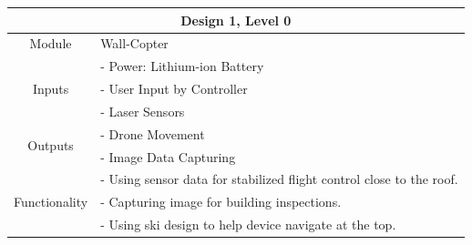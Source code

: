 \documentclass[12pt]{article}
\begin{document}
            \vspace{0.5in}
            \begin{tabular}{|c|l|}
                \hline
                \multicolumn{2}{|c|}{\textbf{Design 1, Level 0}} \\\hline
                Module & Wall-Copter \\\hline
                \multirow{3}{3cm}{Inputs}
                    & - Power: Lithium-ion Battery\\
                    & - User Input by Controller \\
                    & - Laser Sensors \\
                    \hline
                \multirow{2}{3cm}{Outputs}
                    & - Drone Movement \\
                    & - Image Data Capturing \\
                    \hline
                \multirow{3}{3cm}{Functionality}
                    & - Using sensor data for stabilized flight control close to the roof. \\
                    & - Capturing image for building inspections. \\
                    & - Using ski design to help device navigate at the top. \\
                    \hline
                
            \end{tabular}
            \newpage
\end{document}
